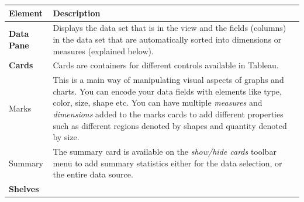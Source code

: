\documentclass[]{book}
\begin{document}
\begin{longtable}[]{@{}ll@{}}
\toprule
\begin{minipage}[b]{0.15\columnwidth}\raggedright
\textbf{Element}\strut
\end{minipage} & \begin{minipage}[b]{0.80\columnwidth}\raggedright
\textbf{Description}\strut
\end{minipage}\tabularnewline
\midrule
\endhead
\begin{minipage}[t]{0.15\columnwidth}\raggedright
\textbf{Data Pane}\strut
\end{minipage} & \begin{minipage}[t]{0.80\columnwidth}\raggedright
Displays the data set that is in the view and the fields (columns) in the data set that are automatically sorted into dimensions or measures (explained below).\strut
\end{minipage}\tabularnewline
\begin{minipage}[t]{0.15\columnwidth}\raggedright
\textbf{Cards}\strut
\end{minipage} & \begin{minipage}[t]{0.80\columnwidth}\raggedright
Cards are containers for different controls available in Tableau.\strut
\end{minipage}\tabularnewline
\begin{minipage}[t]{0.15\columnwidth}\raggedright
Marks\strut
\end{minipage} & \begin{minipage}[t]{0.80\columnwidth}\raggedright
This is a main way of manipulating visual aspects of graphs and charts. You can encode your data fields with elements like type, color, size, shape etc. You can have multiple \emph{measures} and \emph{dimensions} added to the marks cards to add different properties such as different regions denoted by shapes and quantity denoted by size.\strut
\end{minipage}\tabularnewline
\begin{minipage}[t]{0.15\columnwidth}\raggedright
Summary\strut
\end{minipage} & \begin{minipage}[t]{0.80\columnwidth}\raggedright
The summary card is available on the \emph{show/hide cards} toolbar menu to add summary statistics either for the data selection, or the entire data source.\strut
\end{minipage}\tabularnewline
\begin{minipage}[t]{0.15\columnwidth}\raggedright
\textbf{Shelves}\strut

\end{minipage}
\end{longtable}
\end{document}
